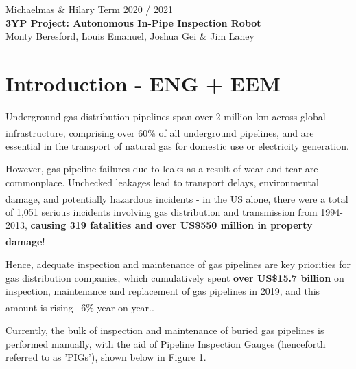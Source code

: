 \documentclass[11pt]{article}		%
\newcommand{\supercite}[1]{\textsuperscript{\cite{#1}}}		%
\begin{document}
	
	\flushleft
	\raggedright

	\begin{center}
		\vspace*{2cm}
		Michaelmas \& Hilary Term 2020 / 2021\\ %
		\vspace*{6cm}
		\huge{\textbf{3YP Project: Autonomous In-Pipe Inspection Robot}}\\ 
		\vspace*{6cm}
		\large{Monty Beresford, Louis Emanuel, Joshua Gei \& Jim Laney}
		\thispagestyle{empty} %
	\end{center}

	\newpage
	
	\tableofcontents
	\thispagestyle{empty} %
	\newpage

	\setcounter{page}{1}
	
	\section{Introduction - ENG + EEM}
Underground gas distribution pipelines span over 2 million km across global infrastructure\supercite{pct2020states}, comprising over 60\% of all underground pipelines\supercite{pct2020states}, and are essential in the transport of natural gas for domestic use or electricity generation. 

However, gas pipeline failures due to leaks as a result of wear-and-tear are commonplace. Unchecked leakages lead to transport delays, environmental damage, and potentially hazardous incidents\supercite{pct2020states} - in the US alone, there were a total of 1,051 serious incidents involving gas distribution and transmission from 1994-2013, \textbf{causing 319 fatalities and over US\$550 million in property damage}\supercite{pct2020states}! %

Hence, adequate inspection and maintenance of gas pipelines are key priorities for gas distribution companies, which cumulatively spent \textbf{over US\$15.7 billion} on inspection, maintenance  and replacement of gas pipelines in 2019, and this amount is rising ~6\% year-on-year.\supercite{pct2020states}. 

Currently, the bulk of inspection and maintenance of buried gas pipelines is performed manually, with the aid of Pipeline Inspection Gauges (henceforth referred to as 'PIGs'), shown below in Figure 1. 
\end{document}
